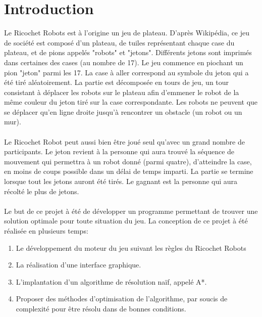 \documentclass[a4paper, 12pt]{article}
\begin{document}
\section{Introduction}
Le Ricochet Robots est à l'origine un jeu de plateau. D'après Wikipédia\cite{Wikipedia}, ce jeu de société est composé d'un plateau, de tuiles représentant chaque case du plateau, et de pions appelés "robots" et "jetons". Différents jetons sont imprimés dans certaines des cases (au nombre de 17). Le jeu commence en piochant un pion "jeton" parmi les 17. La case à aller correspond au symbole du jeton qui a été tiré aléatoirement. La partie est décomposée en tours de jeu, un tour consistant à déplacer les robots sur le plateau afin d'emmener le robot de la même couleur du jeton tiré sur la case correspondante. Les robots ne peuvent que se déplacer qu'en ligne droite jusqu'à rencontrer un obstacle (un robot ou un mur).

    \paragraph{}
    Le Ricochet Robot peut aussi bien être joué seul qu'avec un grand nombre de participants. Le jeton revient à la personne qui aura trouvé la séquence de mouvement qui permettra à un robot donné (parmi quatre), d'atteindre la case, en moins de coups possible dans un délai de temps imparti. La partie se termine lorsque tout les jetons auront été tirés. Le gagnant est la personne qui aura récolté le plus de jetons.
    
    \paragraph{}
    Le but de ce projet à été de développer un programme permettant de trouver une solution optimale pour toute situation du jeu. La conception de ce projet à été réalisée en plusieurs temps:
        \begin{enumerate}
            \item Le développement du moteur du jeu suivant les règles du Ricochet Robots
            \item La réalisation d'une interface graphique.
            \item L'implantation d'un algorithme de résolution naïf, appelé A*.
            \item Proposer des méthodes d'optimisation de l'algorithme, par soucis de complexité pour être résolu dans de bonnes conditions.
        \end{enumerate}
\end{document}
